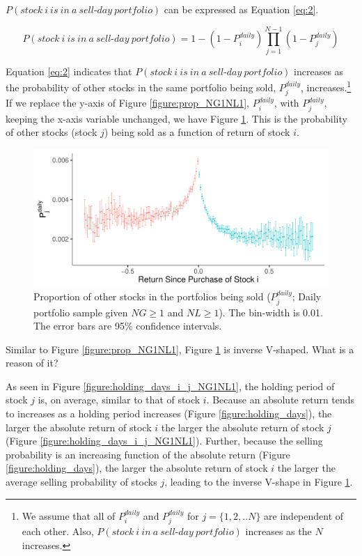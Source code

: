\documentclass[11pt, a4paper]{article}
\begin{document}
$P(stock~i~is~in~a~sell\mbox{-}day~portfolio)$ can be expressed as Equation \ref{eq:2}.

\begin{equation}
\label{eq:2}
P(stock~i~is~in~a~sell\mbox{-}day~portfolio) =1-(1-P^{daily}_{i})\prod_{j=1}^{N-1}(1-P^{daily}_{j})
\end{equation}

Equation \ref{eq:2} indicates that $P(stock~i~is~in~a~sell\mbox{-}day~portfolio)$ increases as the probability of other stocks in the same portfolio being sold, $P^{daily}_{j}$, increases.\footnote{We assume that all of $P^{daily}_{i}$ and $P^{daily}_{j}$ for $j=\{1,2,..N\}$ are independent of each other. Also, $P(stock~i~in~a~sell\mbox{-}day~portfolio)$ increases as the $N$ increases.}\\

If we replace the y-axis of Figure \ref{figure:prop_NG1NL1}, $P^{daily}_{i}$, with $P^{daily}_{j}$, keeping the x-axis variable unchanged, we have Figure \ref{figure:prop_others_NG1NL1}. This is the probability of other stocks (stock $j$) being sold as a function of return of stock $i$.

\begin{figure}[H]
	\centering
	\includegraphics[width=0.8\columnwidth]{barc_other_sold_daily_NG1_NL1.pdf}
	\caption{Proportion of other stocks in the portfolios being sold ($P^{daily}_{j}$; Daily portfolio sample given $NG\geq1$ and $NL\geq1$). The bin-width is 0.01. The error bars are 95\% confidence intervals.}
	\label{figure:prop_others_NG1NL1}
\end{figure}

Similar to Figure \ref{figure:prop_NG1NL1}, Figure \ref{figure:prop_others_NG1NL1} is inverse V-shaped. What is a reason of it? 

As seen in Figure \ref{figure:holding_days_i_j_NG1NL1}, the holding period of stock $j$ is, on average, similar to that of stock $i$. Because an absolute return tends to increases as a holding period increases (Figure \ref{figure:holding_days}), the larger the absolute return of stock $i$ the larger the absolute return of stock $j$ (Figure \ref{figure:holding_days_i_j_NG1NL1}). Further, because the selling probability is an increasing function of the absolute return (Figure \ref{figure:holding_days}), the larger the absolute return of stock $i$ the larger the average selling probability of stocks $j$, leading to the inverse V-shape in Figure \ref{figure:prop_others_NG1NL1}. 
\end{document}
